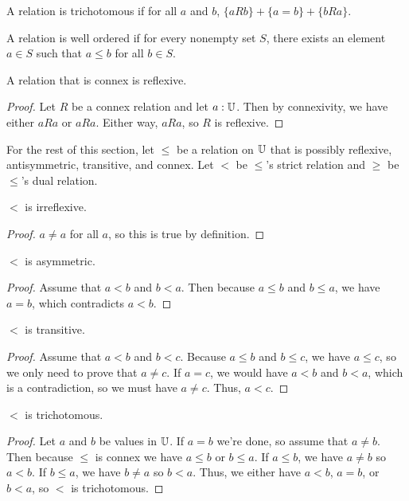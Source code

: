 \documentclass[../math.tex]{subfiles}
\begin{document}
\begin{class}
    A relation is trichotomous if for all $a$ and $b$, $\{aRb\} + \{a = b\} +
    \{bRa\}$.
\end{class}

\begin{class}
    A relation is well ordered if for every nonempty set $S$, there exists an
    element $a \in S$ such that $a \leq b$ for all $b \in S$.
\end{class}

\begin{instance}
    A relation that is connex is reflexive.
\end{instance}
\begin{proof}
    Let $R$ be a connex relation and let $a : \mathbb{U}$.  Then by connexivity, we have
    either $aRa$ or $aRa$.  Either way, $aRa$, so $R$ is reflexive.
\end{proof}

For the rest of this section, let $\leq$ be a relation on $\mathbb{U}$ that is possibly
reflexive, antisymmetric, transitive, and connex.  Let $<$ be $\leq$'s strict
relation and $\geq$ be $\leq$'s dual relation.

\begin{instance}
    $<$ is irreflexive.
\end{instance}
\begin{proof}
    $a \neq a$ for all $a$, so this is true by definition.
\end{proof}

\begin{instance}
    $<$ is asymmetric.
\end{instance}
\begin{proof}
    Assume that $a < b$ and $b < a$.  Then because $a \leq b$ and $b \leq a$, we
    have $a = b$, which contradicts $a < b$.
\end{proof}

\begin{instance}
    $<$ is transitive.
\end{instance}
\begin{proof}
    Assume that $a < b$ and $b < c$.  Because $a \leq b$ and $b \leq c$, we have
    $a \leq c$, so we only need to prove that $a \neq c$.  If $a = c$, we would
    have $a < b$ and $b < a$, which is a contradiction, so we must have $a \neq
    c$.  Thus, $a < c$.
\end{proof}

\begin{instance}
    $<$ is trichotomous.
\end{instance}
\begin{proof}
    Let $a$ and $b$ be values in $\mathbb{U}$.  If $a = b$ we're done, so assume that $a
    \neq b$.  Then because $\leq$ is connex we have $a \leq b$ or $b \leq a$.
    If $a \leq b$, we have $a \neq b$ so $a < b$.  If $b \leq a$, we have $b
    \neq a$ so $b < a$.  Thus, we either have $a < b$, $a = b$, or $b < a$, so
    $<$ is trichotomous.
\end{proof}
\end{document}
